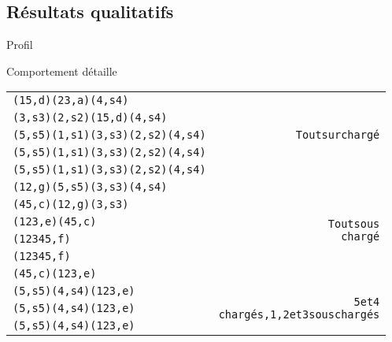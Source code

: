 \documentclass[tikz]{beamer}
\begin{document}
\subsection{Résultats qualitatifs}
\begin{frame}[c]{Profil}
    \begin{figure}
    \end{figure}
\end{frame}
\begin{frame}[c]{Comportement détaille}
  \begin{scriptsize}
    \begin{alltt}
      \begin{tabular}{lr}
        (1 5, d) (2 3, a) (4, s4) & \multirow{5}{20mm}{\textsf{Tout surchargé}}\\
        (3, s3) (2, s2) (1 5, d) (4, s4) & \\
        (5, s5) (1, s1) (3, s3) (2, s2) (4, s4) & \\
        (5, s5) (1, s1) (3, s3) (2, s2) (4, s4) & \\
        (5, s5) (1, s1) (3, s3) (2, s2) (4, s4) & \\
        \midrule
        (1 2, g) (5, s5) (3, s3) (4, s4) & \multirow{6}{20mm}{\textsf{Tout sous
        chargé}}\\
        (4 5, c) (1 2, g) (3, s3) & \\
        (1 2 3, e) (4 5, c) & \\
        (1 2 3 4 5, f) & \\
        (1 2 3 4 5, f) & \\
        (4 5, c) (1 2 3, e) & \\
        \midrule
        (5, s5) (4, s4) (1 2 3, e) & \multirow{3}{20mm}{\textsf{5 et 4
        chargés, 1, 2 et 3 sous chargés}}\\
        (5, s5) (4, s4) (1 2 3, e) & \\
        (5, s5) (4, s4) (1 2 3, e) & \\
      \end{tabular}
    \end{alltt}
  \end{scriptsize}
\end{frame}
\end{document}
